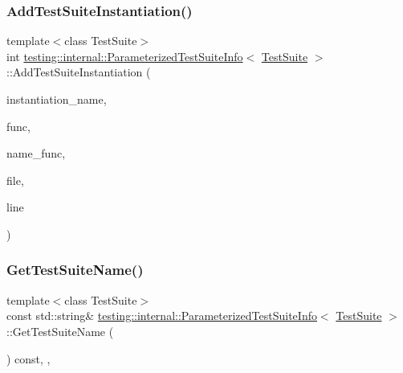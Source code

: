 \subsubsection{\texorpdfstring{AddTestSuiteInstantiation()}{AddTestSuiteInstantiation()}\hspace{0.1cm}{\footnotesize\ttfamily [2/2]}}
{\footnotesize\ttfamily template$<$class Test\+Suite$>$ \\
int \mbox{\hyperlink{classtesting_1_1internal_1_1_parameterized_test_suite_info}{testing\+::internal\+::\+Parameterized\+Test\+Suite\+Info}}$<$ \mbox{\hyperlink{classtesting_1_1_test_suite}{Test\+Suite}} $>$\+::Add\+Test\+Suite\+Instantiation (\begin{DoxyParamCaption}\item[{const std\+::string \&}]{instantiation\+\_\+name,  }\item[{Generator\+Creation\+Func $\ast$}]{func,  }\item[{\mbox{\hyperlink{classtesting_1_1internal_1_1_parameterized_test_suite_info_a3b4f232b7d6d3df941bb8e81b6b534a4}{Param\+Name\+Generator\+Func}} $\ast$}]{name\+\_\+func,  }\item[{const char $\ast$}]{file,  }\item[{int}]{line }\end{DoxyParamCaption})\hspace{0.3cm}{\ttfamily [inline]}}

\mbox{\label{classtesting_1_1internal_1_1_parameterized_test_suite_info_a4a5ddc2cd0404438c2b4d405cd0e706c}} 
\subsubsection{\texorpdfstring{GetTestSuiteName()}{GetTestSuiteName()}\hspace{0.1cm}{\footnotesize\ttfamily [1/2]}}
{\footnotesize\ttfamily template$<$class Test\+Suite$>$ \\
const std\+::string\& \mbox{\hyperlink{classtesting_1_1internal_1_1_parameterized_test_suite_info}{testing\+::internal\+::\+Parameterized\+Test\+Suite\+Info}}$<$ \mbox{\hyperlink{classtesting_1_1_test_suite}{Test\+Suite}} $>$\+::Get\+Test\+Suite\+Name (\begin{DoxyParamCaption}{ }\end{DoxyParamCaption}) const\hspace{0.3cm}{\ttfamily [inline]}, {\ttfamily [override]}, {\ttfamily [virtual]}}



